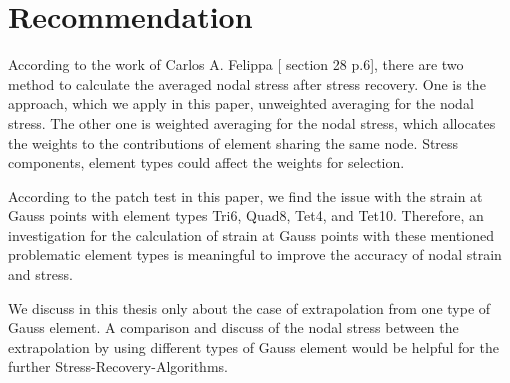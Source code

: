 \section{Recommendation}
According to the work of Carlos A. Felippa [\cite{Felippa} section 28 p.6], there are two method to calculate the averaged nodal stress after stress recovery. One is the approach, which we apply in this paper, unweighted averaging for the nodal stress. The other one is weighted averaging for the nodal stress, which allocates the weights to the contributions of element sharing the same node. Stress components, element types could affect the weights for selection.

According to the patch test in this paper, we find the issue with the strain at Gauss points with element types Tri6, Quad8, Tet4, and Tet10. Therefore, an investigation for the calculation of strain at Gauss points with these mentioned problematic element types is meaningful to improve the accuracy of nodal strain and stress. 

We discuss in this thesis only about the case of extrapolation from one type of Gauss element. A comparison and discuss of the nodal stress between the extrapolation by using different types of Gauss element would be helpful for the further Stress-Recovery-Algorithms. 

\cite{qwe}
\cite{Wang}
\cite{Felippa}\cite{qwe}